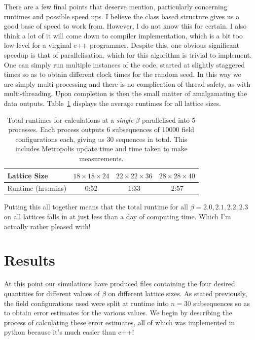 \documentclass[12pt]{article}
\begin{document}
\par There are a few final points that deserve mention, particularly concerning runtimes and possible speed ups. I believe the class based structure gives us a good base of speed to work from. However, I do not know this for certain. I also think a lot of it will come down to compiler implementation, which is a bit too low level for a virginal c++ programmer. Despite this, one obvious significant speedup is that of parallelisation, which for this algorithm is trivial to implement. One can simply run multiple instances of the code, started at slightly staggered times so as to obtain different clock times for the random seed. In this way we are simply multi-processing and there is no complication of thread-safety, as with multi-threading. Upon completion is then the small matter of amalgamating the data outputs. Table~\ref{tab:runtimes} displays the average runtimes for all lattice sizes.

\begin{table}[h]
  \centering
    \begin{tabular}{l|c|c|c}
Lattice Size & $18\times 18 \times 24$ & $22\times 22\times 36$ & $28\times 28\times 40$ \\ \hline
Runtime (hrs:mins)         & 0:52     & 1:33     & 2:57  \\

\end{tabular}
\caption{Total runtimes for calculations at a \emph{single} $\beta$ parallelised into 5 processes. Each process outputs 6 subsequences of 10000 field configurations each, giving us 30 sequences in total. This includes Metropolis update time and time taken to make measurements.}
\label{tab:runtimes}
\end{table}

Putting this all together means that the total runtime for all $\beta=2.0,2.1,2.2,2.3$ on all lattices falls in at just less than a day of computing time. Which I'm actually rather pleased with!



\section{Results}
At this point our simulations have produced files containing the four desired quantities for different values of $\beta$ on different lattice sizes. As stated previously, the field configurations used were split at runtime into $n=30$ subsequences so as to obtain error estimates for the various values. We begin by describing the process of calculating these error estimates, all of which was implemented in python because it's much easier than c++!
\end{document}
